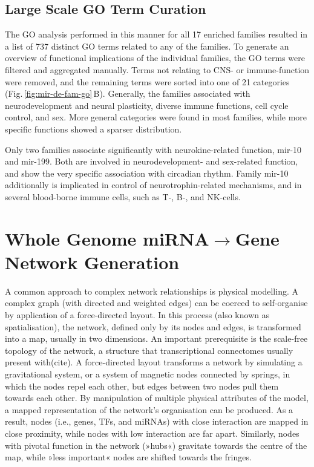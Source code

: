 \subsection{Large Scale GO Term Curation}
The GO analysis performed in this manner for all 17 enriched families resulted in a list of 737 distinct GO terms related to any of the families. To generate an overview of functional implications of the individual families, the GO terms were filtered and aggregated manually. Terms not relating to CNS- or immune-function were removed, and the remaining terms were sorted into one of 21 categories (Fig.\,\ref{fig:mir-de-fam-go}\,B). Generally, the families associated with neurodevelopment and neural plasticity, diverse immune functions, cell cycle control, and sex. More general categories were found in most families, while more specific functions showed a sparser distribution.

Only two families associate significantly with neurokine-related function, mir-10 and mir-199. Both are involved in neurodevelopment- and sex-related function, and show the very specific association with circadian rhythm. Family mir-10 additionally is implicated in control of neurotrophin-related mechanisms, and in several blood-borne immune cells, such as T-, B-, and NK-cells.

\section{Whole Genome miRNA$\to$Gene Network Generation} \label{sec:cellculture:network}
A common approach to complex network relationships is physical modelling. A complex graph (with directed and weighted edges) can be coerced to self-organise by application of a force-directed layout. In this process (also known as spatialisation), the network, defined only by its nodes and edges, is transformed into a map, usually in two dimensions. An important prerequisite is the scale-free topology of the network, a structure that transcriptional connectomes usually present with(cite). A force-directed layout transforms a network by simulating a gravitational system, or a system of magnetic nodes connected by springs, in which the nodes repel each other, but edges between two nodes pull them towards each other. By manipulation of multiple physical attributes of the model, a mapped representation of the network's organisation can be produced. As a result, nodes (i.e., genes, TFs, and miRNAs) with close interaction are mapped in close proximity, while nodes with low interaction are far apart. Similarly, nodes with pivotal function in the network (»hubs«) gravitate towards the centre of the map, while »less important« nodes are shifted towards the fringes.

